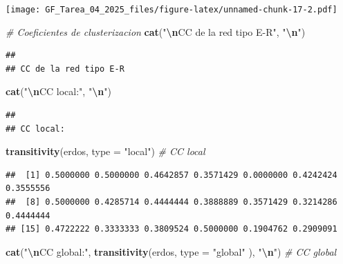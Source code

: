\documentclass[
]{article}
\newenvironment{Shaded}{\begin{snugshade}}{\end{snugshade}}
\newcommand{\AttributeTok}[1]{\textcolor[rgb]{0.13,0.29,0.53}{#1}}
\newcommand{\CommentTok}[1]{\textcolor[rgb]{0.56,0.35,0.01}{\textit{#1}}}
\newcommand{\FunctionTok}[1]{\textcolor[rgb]{0.13,0.29,0.53}{\textbf{#1}}}
\newcommand{\NormalTok}[1]{#1}
\newcommand{\SpecialCharTok}[1]{\textcolor[rgb]{0.81,0.36,0.00}{\textbf{#1}}}
\newcommand{\StringTok}[1]{\textcolor[rgb]{0.31,0.60,0.02}{#1}}
\begin{document}
\texttt{[image: GF\_Tarea\_04\_2025\_files/figure-latex/unnamed-chunk-17-2.pdf]}

\begin{Shaded}
\begin{Highlighting}[]
\CommentTok{\# Coeficientes de clusterizacion}
\FunctionTok{cat}\NormalTok{(}\StringTok{"}\SpecialCharTok{\textbackslash{}n}\StringTok{CC de la red tipo E{-}R"}\NormalTok{, }\StringTok{"}\SpecialCharTok{\textbackslash{}n}\StringTok{"}\NormalTok{)}
\end{Highlighting}
\end{Shaded}

\begin{verbatim}
## 
## CC de la red tipo E-R
\end{verbatim}

\begin{Shaded}
\begin{Highlighting}[]
\FunctionTok{cat}\NormalTok{(}\StringTok{"}\SpecialCharTok{\textbackslash{}n}\StringTok{CC local:"}\NormalTok{, }\StringTok{"}\SpecialCharTok{\textbackslash{}n}\StringTok{"}\NormalTok{)}
\end{Highlighting}
\end{Shaded}

\begin{verbatim}
## 
## CC local:
\end{verbatim}

\begin{Shaded}
\begin{Highlighting}[]
\FunctionTok{transitivity}\NormalTok{(erdos, }\AttributeTok{type =} \StringTok{"local"}\NormalTok{) }\CommentTok{\# CC local}
\end{Highlighting}
\end{Shaded}

\begin{verbatim}
##  [1] 0.5000000 0.5000000 0.4642857 0.3571429 0.0000000 0.4242424 0.3555556
##  [8] 0.5000000 0.4285714 0.4444444 0.3888889 0.3571429 0.3214286 0.4444444
## [15] 0.4722222 0.3333333 0.3809524 0.5000000 0.1904762 0.2909091
\end{verbatim}

\begin{Shaded}
\begin{Highlighting}[]
\FunctionTok{cat}\NormalTok{(}\StringTok{"}\SpecialCharTok{\textbackslash{}n}\StringTok{CC global:"}\NormalTok{, }\FunctionTok{transitivity}\NormalTok{(erdos, }\AttributeTok{type =} \StringTok{"global"}\NormalTok{ ), }\StringTok{"}\SpecialCharTok{\textbackslash{}n}\StringTok{"}\NormalTok{) }\CommentTok{\# CC global}
\end{Highlighting}
\end{Shaded}
\end{document}
